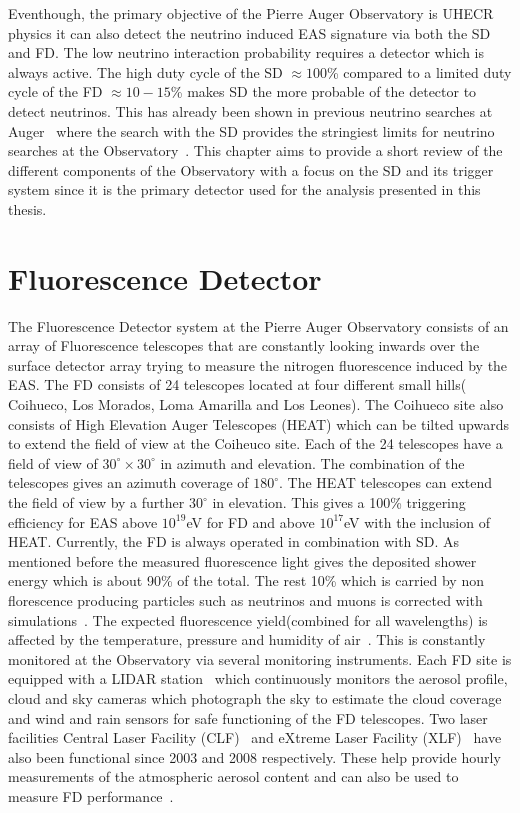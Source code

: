 Eventhough, the primary objective of the Pierre Auger Observatory is UHECR physics it can also detect the neutrino induced EAS signature via both the SD and FD. The low neutrino interaction probability requires a detector which is always active. The high duty cycle of the SD $\approx 100$\% compared to a limited duty cycle of the FD $\approx 10-15$\% makes SD the more probable of the detector to detect neutrinos. This has already been shown in previous neutrino searches at Auger~\cite{} where the search with the SD provides the stringiest limits for neutrino searches at the Observatory~\cite{}. This chapter aims to provide a short review of the different components of the Observatory with a focus on the SD and its trigger system since it is the primary detector used for the analysis presented in this thesis. 

\section{Fluorescence Detector}
\label{sec:Fl_det}
The Fluorescence Detector system at the Pierre Auger Observatory consists of an array of Fluorescence telescopes that are constantly looking inwards over the surface detector array trying to measure the nitrogen fluorescence induced by the EAS. The FD consists of 24 telescopes located at four different small hills( Coihueco, Los Morados, Loma Amarilla and Los Leones). The Coihueco site also consists of High Elevation Auger Telescopes (HEAT) which can be tilted upwards to extend the field of view at the Coiheuco site. Each of the 24 telescopes have a field of view of $30^{\circ} \times 30^{\circ}$ in azimuth and elevation. The combination of the telescopes gives an azimuth coverage of $180^{\circ}$. The HEAT telescopes can extend the field of view by a further $30^{\circ}$ in elevation. This gives a 100\% triggering efficiency for EAS above $10^{19}$eV for FD and above $10^{17}$eV with the inclusion of HEAT. Currently, the FD is always operated in combination with SD. As mentioned before the measured fluorescence light gives the deposited shower energy which is about 90\% of the total. The rest 10\% which is carried by non florescence producing particles such as neutrinos and muons is corrected with simulations~\cite{}. The expected fluorescence yield(combined for all wavelengths) is affected by the temperature, pressure and humidity of air~\cite{}. This is constantly monitored at the Observatory via several monitoring instruments. Each FD site is equipped with a LIDAR station~\cite{} which continuously monitors the aerosol profile, cloud and sky cameras which photograph the sky to estimate the cloud coverage and wind and rain sensors for safe functioning of the FD telescopes. Two laser facilities Central Laser Facility (CLF)~\cite{} and eXtreme Laser Facility (XLF)~\cite{} have also been functional since 2003 and 2008 respectively. These help provide hourly measurements of the atmospheric aerosol content and can also be used to measure FD performance~\cite{}. 

